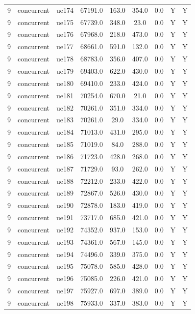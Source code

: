 \begin{table}[ht]
\begin{tabular}{|c|c|c|c|c|c|c|c|c|}
9 & concurrent & ue174 & 67191.0 & 163.0 & 354.0 & 0.0 & Y & Y \\
9 & concurrent & ue175 & 67739.0 & 348.0 & 23.0 & 0.0 & Y & Y \\
9 & concurrent & ue176 & 67968.0 & 218.0 & 473.0 & 0.0 & Y & Y \\
9 & concurrent & ue177 & 68661.0 & 591.0 & 132.0 & 0.0 & Y & Y \\
9 & concurrent & ue178 & 68783.0 & 356.0 & 407.0 & 0.0 & Y & Y \\
9 & concurrent & ue179 & 69403.0 & 622.0 & 430.0 & 0.0 & Y & Y \\
9 & concurrent & ue180 & 69410.0 & 233.0 & 424.0 & 0.0 & Y & Y \\
9 & concurrent & ue181 & 70254.0 & 670.0 & 21.0 & 0.0 & Y & Y \\
9 & concurrent & ue182 & 70261.0 & 351.0 & 334.0 & 0.0 & Y & Y \\
9 & concurrent & ue183 & 70261.0 & 29.0 & 334.0 & 0.0 & Y & Y \\
9 & concurrent & ue184 & 71013.0 & 431.0 & 295.0 & 0.0 & Y & Y \\
9 & concurrent & ue185 & 71019.0 & 84.0 & 288.0 & 0.0 & Y & Y \\
9 & concurrent & ue186 & 71723.0 & 428.0 & 268.0 & 0.0 & Y & Y \\
9 & concurrent & ue187 & 71729.0 & 93.0 & 262.0 & 0.0 & Y & Y \\
9 & concurrent & ue188 & 72212.0 & 233.0 & 422.0 & 0.0 & Y & Y \\
9 & concurrent & ue189 & 72867.0 & 526.0 & 430.0 & 0.0 & Y & Y \\
9 & concurrent & ue190 & 72878.0 & 183.0 & 419.0 & 0.0 & Y & Y \\
9 & concurrent & ue191 & 73717.0 & 685.0 & 421.0 & 0.0 & Y & Y \\
9 & concurrent & ue192 & 74352.0 & 937.0 & 153.0 & 0.0 & Y & Y \\
9 & concurrent & ue193 & 74361.0 & 567.0 & 145.0 & 0.0 & Y & Y \\
9 & concurrent & ue194 & 74496.0 & 339.0 & 375.0 & 0.0 & Y & Y \\
9 & concurrent & ue195 & 75078.0 & 585.0 & 428.0 & 0.0 & Y & Y \\
9 & concurrent & ue196 & 75085.0 & 226.0 & 421.0 & 0.0 & Y & Y \\
9 & concurrent & ue197 & 75927.0 & 697.0 & 389.0 & 0.0 & Y & Y \\
9 & concurrent & ue198 & 75933.0 & 337.0 & 383.0 & 0.0 & Y & Y \\

\end{tabular}
\end{table}
